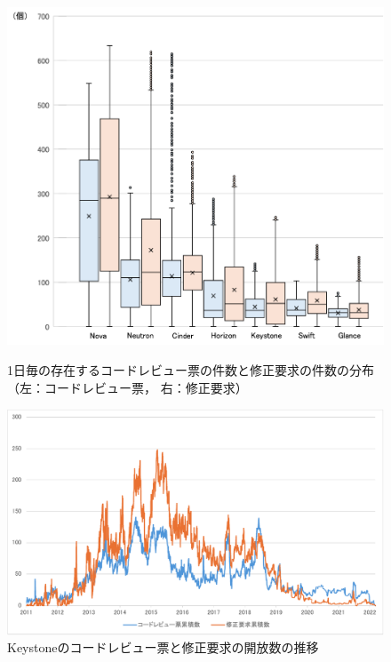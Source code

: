 \documentclass[11pt]{jreport}
\begin{document}
\begin{figure}[t]
\centerline{\includegraphics[width=1.0\linewidth]{@BSthesis2024_Kawasaki/BSthesis2024_Kawasaki_fig/task_dist.pdf}}
\caption{1日毎の存在するコードレビュー票の件数と修正要求の件数の分布（左：コードレビュー票， 右：修正要求）}
\label{fig:task_dist}

\vspace{2mm}

\centerline{\includegraphics[width=1.0\linewidth]{@BSthesis2024_Kawasaki/BSthesis2024_Kawasaki_fig/task_trans.pdf}}
\caption{Keystoneのコードレビュー票と修正要求の開放数の推移}
\label{fig:task_trans}
\end{figure}
\end{document}
